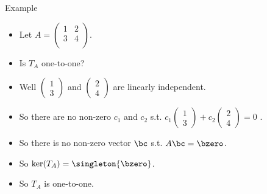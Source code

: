 \documentclass{beamer}
\begin{document}

\begin{frame}{Example}

\begin{itemize}
\item Let
$A =
\begin{pmatrix}
1 & 2 \\
3 & 4 \\
\end{pmatrix}
$.
\item Is $T_A$ one-to-one?
\item Well
$
\begin{pmatrix}
1 \\ 3
\end{pmatrix}
$
and
$
\begin{pmatrix}
2 \\ 4
\end{pmatrix}
$
are linearly independent.
\item So there are no non-zero $c_1$ and $c_2$ s.t.
$
c_1
\begin{pmatrix}
1 \\ 3
\end{pmatrix}
+c_2
\begin{pmatrix}
2 \\ 4
\end{pmatrix}
=0
$
.
\item So there is no non-zero vector $\bc$  s.t. $A\bc=\bzero$.
\item So $\ker(T_A) = \singleton{\bzero}$.
\item So $T_A$ is one-to-one.
\end{itemize}
\end{frame}

\end{document}
